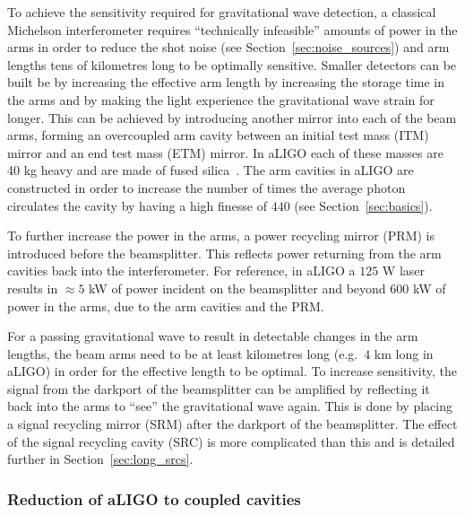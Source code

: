 \documentclass[aps,pra,superscriptaddress,reprint,nofootinbib]{revtex4-1}
\begin{document}
To achieve the sensitivity required for gravitational wave detection, a classical Michelson interferometer requires “technically infeasible” amounts of power in the arms in order to reduce the shot noise (see Section~\ref{sec:noise_sources}) and arm lengths tens of kilometres long to be optimally sensitive.
Smaller detectors can be built be by increasing the effective arm length by increasing the storage time in the arms and by making the light experience the gravitational wave strain for longer. This can be achieved by introducing another mirror into each of the beam arms, forming an overcoupled arm cavity between an initial test mass (ITM) mirror and an end test mass (ETM) mirror. In aLIGO each of these masses are 40 kg heavy and are made of fused silica~\cite{AdvancedLIGO:2015}. The arm cavities in aLIGO are constructed in order to increase the number of times the average photon circulates the cavity by having a high finesse of $440$ (see Section~\ref{sec:basics}).


To further increase the power in the arms, a power recycling mirror (PRM) is introduced before the beamsplitter. This reflects power returning from the arm cavities back into the interferometer. For reference, in aLIGO a $125$ W laser results in $\approx 5$ kW of power incident on the beamsplitter and beyond $600$ kW of power in the arms, due to the arm cavities and the PRM.


For a passing gravitational wave to result in detectable changes in the arm lengths, the beam arms need to be at least kilometres long (e.g.\ $4$ km long in aLIGO) in order for the effective length to be optimal. To increase sensitivity, the signal from the darkport of the beamsplitter can be amplified by reflecting it back into the arms to ``see'' the gravitational wave again. This is done by placing a signal recycling mirror (SRM) after the darkport of the beamsplitter. The effect of the signal recycling cavity (SRC) is more complicated than this and is detailed further in Section~\ref{sec:long_srcs}.


\subsubsection{Reduction of aLIGO to coupled cavities}
\end{document}

